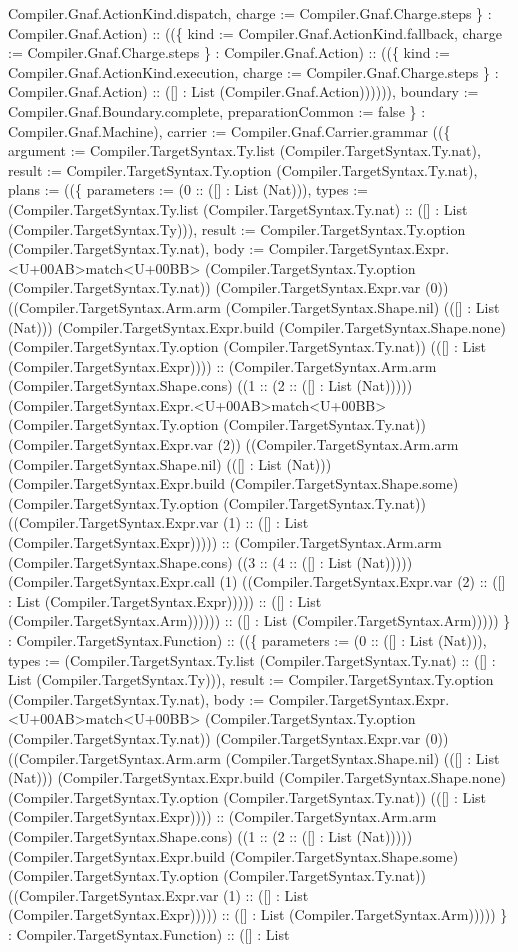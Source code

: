 \documentclass[11pt]{article}
\begin{document}
Compiler.Gnaf.ActionKind.dispatch, charge := Compiler.Gnaf.Charge.steps \} : Compiler.Gnaf.Action) :: ((\{ kind := Compiler.Gnaf.ActionKind.fallback, charge := Compiler.Gnaf.Charge.steps \} : Compiler.Gnaf.Action) :: ((\{ kind := Compiler.Gnaf.ActionKind.execution, charge := Compiler.Gnaf.Charge.steps \} : Compiler.Gnaf.Action) :: ([] : List (Compiler.Gnaf.Action)))))), boundary := Compiler.Gnaf.Boundary.complete, preparationCommon := false \} : Compiler.Gnaf.Machine), carrier := Compiler.Gnaf.Carrier.grammar ((\{ argument := Compiler.TargetSyntax.Ty.list (Compiler.TargetSyntax.Ty.nat), result := Compiler.TargetSyntax.Ty.option (Compiler.TargetSyntax.Ty.nat), plans := ((\{ parameters := (0 :: ([] : List (Nat))), types := (Compiler.TargetSyntax.Ty.list (Compiler.TargetSyntax.Ty.nat) :: ([] : List (Compiler.TargetSyntax.Ty))), result := Compiler.TargetSyntax.Ty.option (Compiler.TargetSyntax.Ty.nat), body := Compiler.TargetSyntax.Expr.<U+00AB>match<U+00BB> (Compiler.TargetSyntax.Ty.option (Compiler.TargetSyntax.Ty.nat)) (Compiler.TargetSyntax.Expr.var (0)) ((Compiler.TargetSyntax.Arm.arm (Compiler.TargetSyntax.Shape.nil) (([] : List (Nat))) (Compiler.TargetSyntax.Expr.build (Compiler.TargetSyntax.Shape.none) (Compiler.TargetSyntax.Ty.option (Compiler.TargetSyntax.Ty.nat)) (([] : List (Compiler.TargetSyntax.Expr)))) :: (Compiler.TargetSyntax.Arm.arm (Compiler.TargetSyntax.Shape.cons) ((1 :: (2 :: ([] : List (Nat))))) (Compiler.TargetSyntax.Expr.<U+00AB>match<U+00BB> (Compiler.TargetSyntax.Ty.option (Compiler.TargetSyntax.Ty.nat)) (Compiler.TargetSyntax.Expr.var (2)) ((Compiler.TargetSyntax.Arm.arm (Compiler.TargetSyntax.Shape.nil) (([] : List (Nat))) (Compiler.TargetSyntax.Expr.build (Compiler.TargetSyntax.Shape.some) (Compiler.TargetSyntax.Ty.option (Compiler.TargetSyntax.Ty.nat)) ((Compiler.TargetSyntax.Expr.var (1) :: ([] : List (Compiler.TargetSyntax.Expr))))) :: (Compiler.TargetSyntax.Arm.arm (Compiler.TargetSyntax.Shape.cons) ((3 :: (4 :: ([] : List (Nat))))) (Compiler.TargetSyntax.Expr.call (1) ((Compiler.TargetSyntax.Expr.var (2) :: ([] : List (Compiler.TargetSyntax.Expr))))) :: ([] : List (Compiler.TargetSyntax.Arm)))))) :: ([] : List (Compiler.TargetSyntax.Arm))))) \} : Compiler.TargetSyntax.Function) :: ((\{ parameters := (0 :: ([] : List (Nat))), types := (Compiler.TargetSyntax.Ty.list (Compiler.TargetSyntax.Ty.nat) :: ([] : List (Compiler.TargetSyntax.Ty))), result := Compiler.TargetSyntax.Ty.option (Compiler.TargetSyntax.Ty.nat), body := Compiler.TargetSyntax.Expr.<U+00AB>match<U+00BB> (Compiler.TargetSyntax.Ty.option (Compiler.TargetSyntax.Ty.nat)) (Compiler.TargetSyntax.Expr.var (0)) ((Compiler.TargetSyntax.Arm.arm (Compiler.TargetSyntax.Shape.nil) (([] : List (Nat))) (Compiler.TargetSyntax.Expr.build (Compiler.TargetSyntax.Shape.none) (Compiler.TargetSyntax.Ty.option (Compiler.TargetSyntax.Ty.nat)) (([] : List (Compiler.TargetSyntax.Expr)))) :: (Compiler.TargetSyntax.Arm.arm (Compiler.TargetSyntax.Shape.cons) ((1 :: (2 :: ([] : List (Nat))))) (Compiler.TargetSyntax.Expr.build (Compiler.TargetSyntax.Shape.some) (Compiler.TargetSyntax.Ty.option (Compiler.TargetSyntax.Ty.nat)) ((Compiler.TargetSyntax.Expr.var (1) :: ([] : List (Compiler.TargetSyntax.Expr))))) :: ([] : List (Compiler.TargetSyntax.Arm))))) \} : Compiler.TargetSyntax.Function) :: ([] : List 
\end{document}

